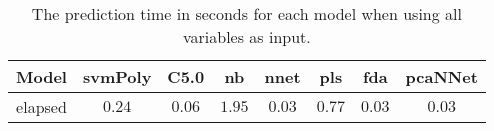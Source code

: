 \begin{table}[!ht]
	\centering
	\begin{tabular}{|c|c|c|c|c|c|c|c|}
		\hline
		Model & svmPoly & C5.0 & nb & nnet & pls & fda & pcaNNet \\ \hline
		elapsed & $0.24$ & $0.06$ & $1.95$ & $0.03$ & $0.77$ & $0.03$ & $0.03$ \\ \hline
	\end{tabular}
	\caption{The prediction time in seconds for each model when using all variables as input.}
	\label{tab:time:reverse:all:predict}
\end{table}
